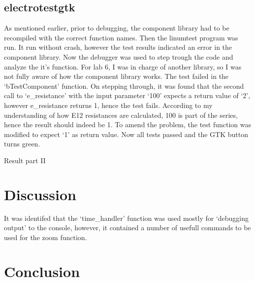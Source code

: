 \documentclass[a4paper,11pt,twoside]{article}
\begin{document}
\subsection{electrotestgtk}
As mentioned earlier, prior to debugging, the component library had to be
recompiled with the correct function names. Then the linumtest program was
run. It run without crash, however the test results indicated an error
in the component library. Now the debugger was used to step trough the code
and analyze the it's function. For lab 6, I was in charge of another library,
so I was not fully aware of how the component library works. The test failed
in the `bTestComponent' function. On stepping through, it was found that the
second call to `e\_resistance' with the input parameter `100' expects a return
value of `2', however e\_resistance returns 1, hence the test fails. According
to my understanding of how E12 resistances are calculated, 100 is part of the
series, hence the result should indeed be 1. To amend the problem, the test
function was modified to expect `1' as return value. Now all tests passed
and the GTK button turns green.

Result part II

\section{Discussion}
It was identifed that the `time_handler' function was
used mostly for `debugging output' to the console, however, it contained a
number of usefull commands to be used for the zoom function.


\section{Conclusion}



%
\end{document}
